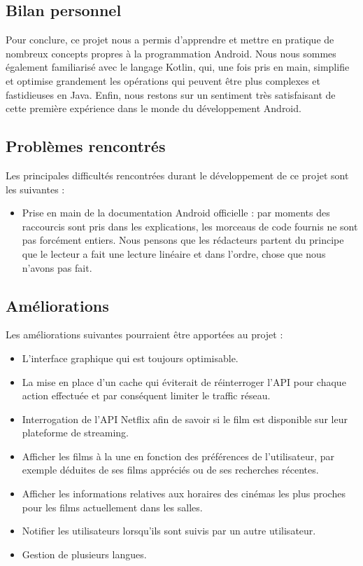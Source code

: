 \subsection{Bilan personnel}
Pour conclure, ce projet nous a permis d'apprendre et mettre en pratique de nombreux concepts propres à la programmation Android. Nous nous sommes également familiarisé avec le langage Kotlin, qui, une fois pris en main, simplifie et optimise grandement les opérations qui peuvent être plus complexes et fastidieuses en Java. Enfin, nous restons sur un sentiment très satisfaisant de cette première expérience dans le monde du développement Android.

\subsection{Problèmes rencontrés}
Les principales difficultés rencontrées durant le développement de ce projet sont les suivantes :
\begin{itemize}
    \item Prise en main de la documentation Android officielle : par moments des raccourcis sont pris dans les explications, les morceaus de code fournis ne sont pas forcément entiers. Nous pensons que les rédacteurs partent du principe que le lecteur a fait une lecture linéaire et dans l'ordre, chose que nous n'avons pas fait.
\end{itemize}

\subsection{Améliorations}
Les améliorations suivantes pourraient être apportées au projet :
\begin{itemize}
    \item L'interface graphique qui est toujours optimisable.
    \item La mise en place d'un cache qui éviterait de réinterroger l'API pour chaque action effectuée et par conséquent limiter le traffic réseau.
    \item Interrogation de l'API Netflix afin de savoir si le film est disponible sur leur plateforme de streaming.
    \item Afficher les films à la une en fonction des préférences de l'utilisateur, par exemple déduites de ses films appréciés ou de ses recherches récentes.
    \item Afficher les informations relatives aux horaires des cinémas les plus proches pour les films actuellement dans les salles.
    \item Notifier les utilisateurs lorsqu'ils sont suivis par un autre utilisateur.
    \item Gestion de plusieurs langues.
\end{itemize}
